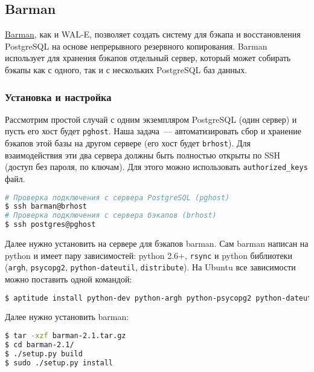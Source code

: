 \subsection{Barman}

\href{http://www.pgbarman.org/}{Barman}, как и WAL-E, позволяет создать систему для бэкапа и восстановления PostgreSQL на основе непрерывного резервного копирования. Barman использует для хранения бэкапов отдельный сервер, который может собирать бэкапы как с одного, так и с нескольких PostgreSQL баз данных.

\subsubsection{Установка и настройка}

Рассмотрим простой случай с одним экземпляром PostgreSQL (один сервер) и пусть его хост будет \lstinline!pghost!. Наша задача~--- автоматизировать сбор и хранение бэкапов этой базы на другом сервере (его хост будет \lstinline!brhost!). Для взаимодействия эти два сервера должны быть полностью открыты по SSH (доступ без пароля, по ключам). Для этого можно использовать \lstinline!authorized_keys! файл.

\begin{lstlisting}[language=Bash,label=lst:barman1,caption=Проверка подключения по SSH]
# Проверка подключения с сервера PostgreSQL (pghost)
$ ssh barman@brhost
# Проверка подключения с сервера бэкапов (brhost)
$ ssh postgres@pghost
\end{lstlisting}

Далее нужно установить на сервере для бэкапов barman. Сам barman написан на python и имеет пару зависимостей: python 2.6+, \lstinline!rsync! и python библиотеки (\lstinline!argh!, \lstinline!psycopg2!, \lstinline!python-dateutil!, \lstinline!distribute!). На Ubuntu все зависимости можно поставить одной командой:

\begin{lstlisting}[language=Bash,label=lst:barman2,caption=Установка зависимостей barman]
$ aptitude install python-dev python-argh python-psycopg2 python-dateutil rsync python-setuptools
\end{lstlisting}

Далее нужно установить barman:

\begin{lstlisting}[language=Bash,label=lst:barman3,caption=Установка barman]
$ tar -xzf barman-2.1.tar.gz
$ cd barman-2.1/
$ ./setup.py build
$ sudo ./setup.py install
\end{lstlisting}

